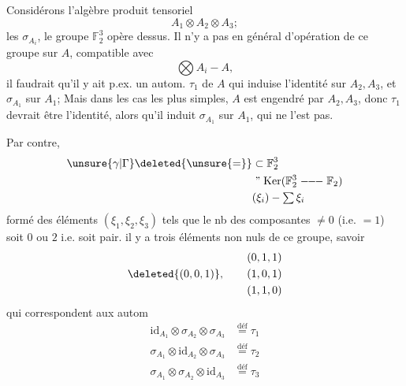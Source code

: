 Considérons l'algèbre produit tensoriel
\[
 A_1\otimes A_2\otimes A_3;
\]
 les $\sigma_{A_i}$, le groupe $\mathbb F_2^3$ opère dessus. Il n'y a pas en général d'opération de ce groupe sur $A$, compatible avec
\[
 \bigotimes A_i\mathbin{-}A,
\]
 il faudrait qu'il y ait p.ex. un autom. $\tau_1$ de $A$ qui induise l'identité sur $A_2,A_3$, et $\sigma_{A_1}$ sur $A_1$; Mais dans les cas les plus simples, $A$ est engendré par $A_2,A_3$, donc $\tau_1$ devrait être l'identité, alors qu'il induit $\sigma_{A_1}$ sur $A_1$, qui ne l'est pas.

Par contre, 
\[
 \begin{aligned}
 \unsure{\gamma|\Gamma}\deleted{\unsure{=}}&\subset\mathbb F_2^3\\
 &\mathrel{\text{''}}\operatorname{Ker}(\mathbb F_2^3\mathrel{-\!\!-\!\!-}\mathbb F_2)\\
 &(\xi_i)\mathbin{-}\textstyle\sum\xi_i
 \end{aligned}
\]
formé des éléments $(\xi_1,\xi_2,\xi_3)$ tels que le nb des composantes $\ne0$ (i.e. $=1$) soit $0$ ou $2$ i.e. soit pair.  il y  a trois éléments non nuls de ce groupe, savoir
\[
 \deleted{(0,0,1)},\qquad\begin{gathered}(0,1,1)\\(1,0,1)\\(1,1,0)\end{gathered}
\]
qui correspondent aux autom
\[
 \begin{aligned}
 \mathrm{id}_{A_1}\otimes\sigma_{A_2}\otimes\sigma_{A_3}&\overset{\mathrm{déf}}{=}\tau_1\\
 \sigma_{A_1}\otimes\mathrm{id}_{A_2}\otimes\sigma_{A_3}&\overset{\mathrm{déf}}{=}\tau_2\\
 \sigma_{A_1}\otimes\sigma_{A_2}\otimes\mathrm{id}_{A_3}&\overset{\mathrm{déf}}{=}\tau_3
 \end{aligned}
\]

